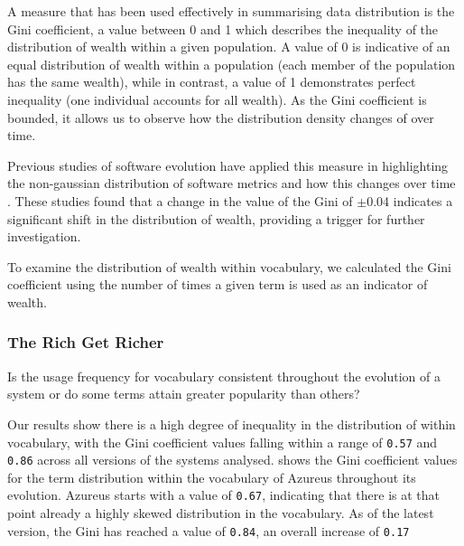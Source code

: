 A measure that has been used effectively in summarising data distribution is the Gini coefficient, a value between 0 and 1 which describes the inequality of the distribution of wealth within a given population. A value of 0 is indicative of an equal distribution of wealth within a population (\ie each member of the population has the same wealth), while in contrast, a value of 1 demonstrates perfect inequality (\ie one individual accounts for all wealth). As the Gini coefficient is bounded, it allows us to observe how the distribution density changes of over time.

Previous studies of software evolution \cite{Vasa09a} have applied this measure in highlighting the non-gaussian distribution of software metrics and how this changes over time \cite{Vasa09a}. These studies found that a change in the value of the Gini of $\pm$0.04 indicates a significant shift in the distribution of wealth, providing a trigger for further investigation. 

To examine the distribution of wealth within vocabulary, we calculated the Gini coefficient using the number of times a given term is used as an indicator of wealth.


\subsubsection{The Rich Get Richer} %
\label{sub:the_rich_get_richer}

Is the usage frequency for vocabulary consistent throughout the evolution of a system or do some terms attain greater popularity than others?

Our results show there is a high degree of inequality in the distribution of within vocabulary, with the Gini coefficient values falling within a range of \texttt{0.57} and \texttt{0.86} across all versions of the systems analysed.  shows the Gini coefficient values for the term distribution within the vocabulary of Azureus throughout its evolution. Azureus starts with a value of \texttt{0.67}, indicating that there is at that point already a highly skewed distribution in the vocabulary. As of the latest version, the Gini has reached a value of \texttt{0.84}, an overall increase of \texttt{0.17}

